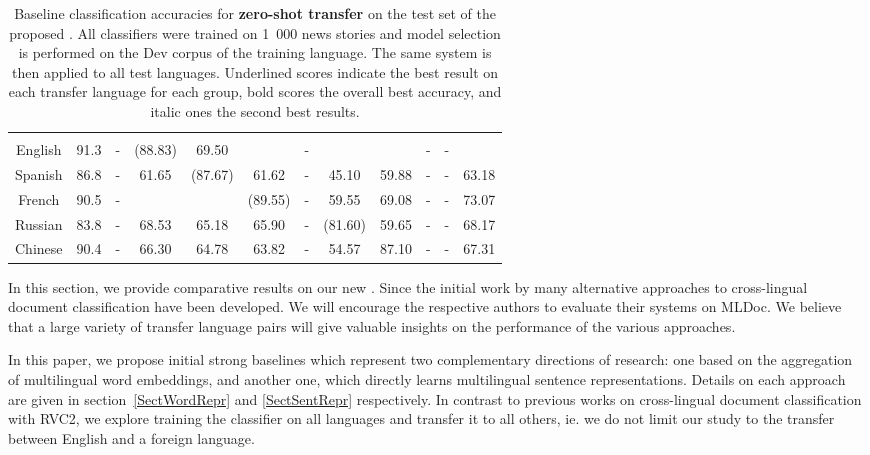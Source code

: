 \documentclass[10pt, a4paper]{article}
\begin{document}
\begin{table*}[t]
\begin{tabular}[t]{|c||c|*{8}{@{\,\,}c@{\,\,}|}|c|c|}
    \hline
     \\
    English   & 91.3 & - & (88.83) & 69.50 &  & - &  &  & - & - &  \\
    Spanish   & 86.8 & - & 61.65 & (87.67) & 61.62 & - & 45.10 & 59.88 & - & - & 63.18 \\
    French    & 90.5 & - &  &  & (89.55) & - & 59.55 & 69.08 & - & - & 73.07 \\
    Russian   & 83.8 & - & 68.53 & 65.18 & 65.90 & - & (81.60) & 59.65 & - & - & 68.17 \\
    Chinese   & 90.4 & - & 66.30 & 64.78 & 63.82 & - & 54.57 & 87.10 & - & - & 67.31 \\
    \hline
  \end{tabular}
  \caption[]{
    Baseline classification accuracies for \textbf{zero-shot transfer} on the test set of
    the proposed \mldcc{}.
    All classifiers were trained on 1~000 news stories and model selection is performed on
    the Dev corpus of the training language. The same system is then applied to all test languages.
    Underlined scores indicate the best result on each transfer language for each group,
    bold scores the overall best accuracy, and italic ones the second best results.
  }
  \label{TabResZeroShot}
\end{table*}


In this section, we provide comparative results on our new \mldcc{}.  Since the initial work by \cite{Klementiev:2012:coling_reuters} many alternative approaches to cross-lingual document classification have been developed. We will encourage the respective authors to evaluate their systems on MLDoc. We believe that a large variety of transfer language pairs will give valuable insights on the performance of the various approaches.

In this paper, we propose initial strong baselines which represent two complementary directions of research: one based on the aggregation of multilingual word embeddings, and another one, which directly learns multilingual sentence representations.
Details on each approach are given in section~\ref{SectWordRepr} and \ref{SectSentRepr} respectively.
In contrast to previous works on cross-lingual document classification with RVC2, we explore training the classifier on all languages and transfer it to all others, ie. we do not limit our study to the transfer between English and a foreign language.
\end{document}
